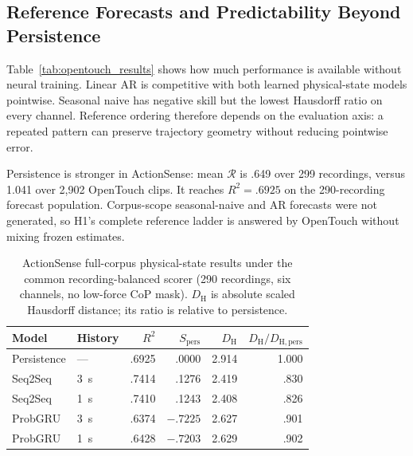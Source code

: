 \documentclass[letterpaper, 10 pt, conference]{ieeeconf}
\newcommand{\Rdiff}{\mathcal{R}}
\newcommand{\Rtwo}{R^{2}}
\begin{document}
\subsection{Reference Forecasts and Predictability Beyond Persistence}
\label{sec:results_references}

Table~\ref{tab:opentouch_results} shows how much performance is available without neural training. Linear AR is competitive with both learned physical-state models pointwise. Seasonal naive has negative skill but the lowest Hausdorff ratio on every channel. Reference ordering therefore depends on the evaluation axis: a repeated pattern can preserve trajectory geometry without reducing pointwise error.

Persistence is stronger in ActionSense: mean $\Rdiff$ is .649 over 299 recordings, versus 1.041 over 2,902 OpenTouch clips. It reaches $\Rtwo=.6925$ on the 290-recording forecast population. Corpus-scope seasonal-naive and AR forecasts were not generated, so H1's complete reference ladder is answered by OpenTouch without mixing frozen estimates.

\begin{table}[t]
\caption{ActionSense full-corpus physical-state results under the common recording-balanced scorer (290 recordings, six channels, no low-force CoP mask). $D_{\mathrm{H}}$ is absolute scaled Hausdorff distance; its ratio is relative to persistence.}
\label{tab:actionsense_results}
\centering
\scriptsize
\begin{tabular}{llrrrr}
\toprule
Model & History & $\Rtwo$ & $S_{\mathrm{pers}}$ & $D_{\mathrm{H}}$ & $D_{\mathrm{H}}/D_{\mathrm{H,pers}}$ \\
\midrule
Persistence & --- & .6925 & .0000 & 2.914 & 1.000 \\
Seq2Seq & 3~s & .7414 & .1276 & 2.419 & .830 \\
Seq2Seq & 1~s & .7410 & .1243 & 2.408 & .826 \\
ProbGRU & 3~s & .6374 & $-.7225$ & 2.627 & .901 \\
ProbGRU & 1~s & .6428 & $-.7203$ & 2.629 & .902 \\
\bottomrule
\end{tabular}
\end{table}
\end{document}
